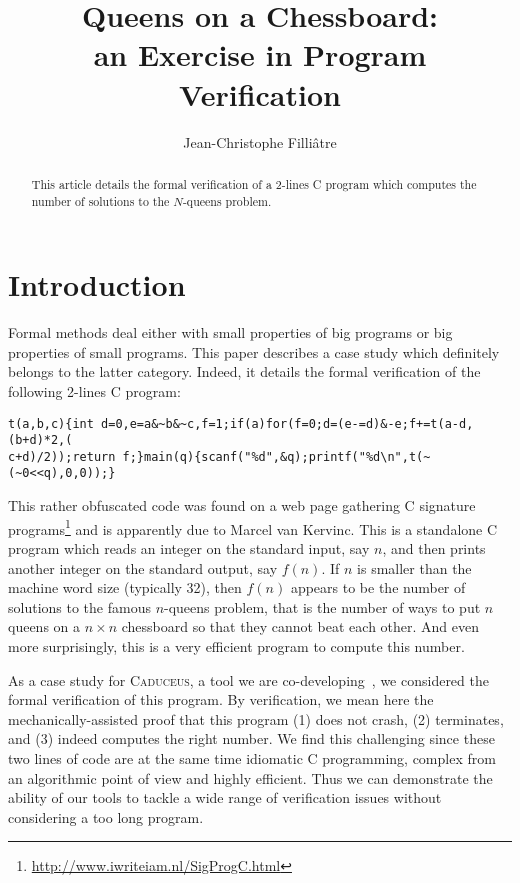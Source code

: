 \documentclass[a4paper]{llncs}
\newcommand{\caduceus}{\textsc{Caduceus}}
\begin{document}
\title{Queens on a Chessboard: \\
       an Exercise in Program Verification}
\author{Jean-Christophe Filli\^atre}
\maketitle

\begin{abstract}
  This article details the formal verification of a 2-lines C program
  which computes the number of solutions to the $N$-queens problem.
\end{abstract}

\section{Introduction}

Formal methods deal either with small properties of big programs or
big properties of small programs. This paper describes a case study
which definitely belongs to the latter category.
Indeed, it details the formal verification of the following 2-lines C program:
{\small%
\begin{verbatim}
t(a,b,c){int d=0,e=a&~b&~c,f=1;if(a)for(f=0;d=(e-=d)&-e;f+=t(a-d,(b+d)*2,(
c+d)/2));return f;}main(q){scanf("%d",&q);printf("%d\n",t(~(~0<<q),0,0));}
\end{verbatim}}
\noindent 
This rather obfuscated code was found on a web page gathering C signature
programs\footnote{\url{http://www.iwriteiam.nl/SigProgC.html}} and is
apparently due to Marcel van Kervinc. This is a standalone C program
which reads an integer on the standard input, say $n$, and then prints another
integer on the standard output, say $f(n)$. If $n$ is smaller than the
machine word size (typically 32), then
$f(n)$ appears to be the number of solutions to the famous $n$-queens
problem, that is the number of ways to put $n$ queens on a $n\times n$
chessboard so that they cannot beat each other. And even more
surprisingly, this is a very efficient program to compute this number.

As a case study for \caduceus, a tool we are
co-developing~\cite{caduceus}, we considered 
the formal verification of this program. By verification, we mean here
the mechanically-assisted proof that this program (1) does not crash, 
(2) terminates, and (3) indeed computes the right number. We find this
challenging since these two lines of code are at the same time idiomatic C
programming, complex from an algorithmic point of view and highly
efficient. Thus we can demonstrate the ability of our tools to tackle
a wide range of verification issues without considering a too long
program. 
\end{document}
